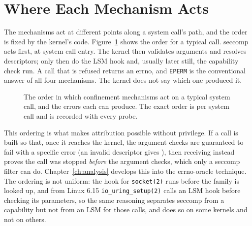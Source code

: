 \section{Where Each Mechanism Acts}
\label{sec:bg-ordering}

The mechanisms act at different points along a system call's path, and the order is fixed by the kernel's code. Figure~\ref{fig:bg-ordering} shows the order for a typical call. seccomp acts first, at system call entry. The kernel then validates arguments and resolves descriptors; only then do the LSM hook and, usually later still, the capability check run. A call that is refused returns an errno, and \texttt{EPERM} is the conventional answer of all four mechanisms. The kernel does not say which one produced it.

\begin{figure}[htbp]
\centering
{}
\caption{The order in which confinement mechanisms act on a typical system call, and the errors each can produce. The exact order is per system call and is recorded with every probe.}
\label{fig:bg-ordering}
\end{figure}

This ordering is what makes attribution possible without privilege. If a call is built so that, once it reaches the kernel, the argument checks are guaranteed to fail with a specific error (an invalid descriptor gives ), then receiving  instead proves the call was stopped \emph{before} the argument checks, which only a seccomp filter can do. Chapter~\ref{ch:analysis} develops this into the errno-oracle technique. The ordering is not uniform: the hook for \texttt{socket(2)} runs before the family is looked up, and from Linux 6.15 \texttt{io\_uring\_setup(2)} calls an LSM hook before checking its parameters, so the same reasoning separates seccomp from a capability but not from an LSM for those calls, and does so on some kernels and not on others.

